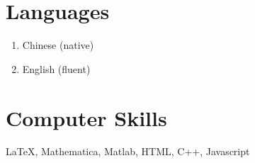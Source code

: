 \documentclass[margin]{res}
\begin{document}
\begin{resume}
\section{Languages}
\begin{enumerate}[--]
\item Chinese (native)
\item English (fluent)
\end{enumerate}

\section{Computer Skills}
\LaTeX, Mathematica, Matlab, HTML, C++, Javascript

\end{resume}
\end{document}
